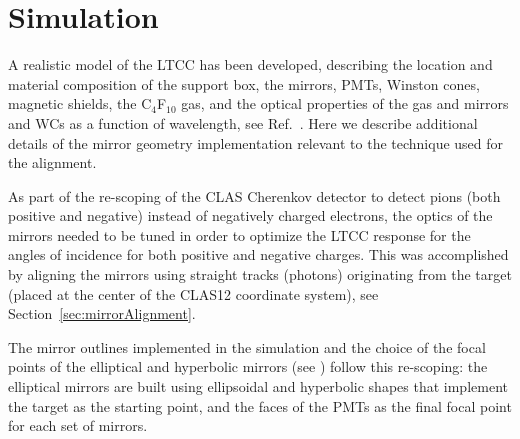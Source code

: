 \section{Simulation}

A realistic model of the LTCC has been developed, describing the location and material composition of the support
box, the mirrors, PMTs, Winston cones, magnetic shields, the C$_4$F$_{10}$ gas, and the optical properties of the
gas and mirrors and WCs as a function of wavelength, see Ref.~\cite{sim-nim}. Here we describe additional details
of the mirror geometry implementation relevant to the technique used for the alignment.

As part of the re-scoping of the CLAS Cherenkov detector to detect pions (both positive and negative) instead of
negatively charged electrons, the optics of the mirrors needed to be tuned in order to optimize the LTCC response
for the angles of incidence for both positive and negative charges. This was accomplished by aligning the mirrors using
straight tracks (photons) originating from the target (placed at the center of the CLAS12 coordinate system), see
Section~\ref{sec:mirrorAlignment}.

The mirror outlines implemented in the simulation and the choice of the focal points of the elliptical and
hyperbolic mirrors (see ) follow this re-scoping: the elliptical mirrors are built using ellipsoidal and
hyperbolic shapes that implement the target as the starting point, and the faces of the PMTs as the final focal point
for each set of mirrors.

